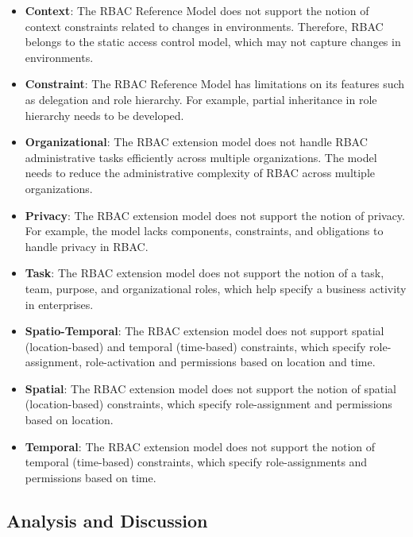 \begin{itemize}

  \item \textbf{Context}: The RBAC Reference Model does not support the notion of context constraints related to changes in environments. Therefore, RBAC belongs to the static access control model, which may not capture changes in environments.
 
  \item \textbf{Constraint}: The RBAC Reference Model has limitations on its features such as delegation and role hierarchy. For example, partial inheritance in role hierarchy needs to be developed.
  
  \item \textbf{Organizational}: The RBAC extension model does not handle RBAC administrative tasks efficiently across multiple organizations. The model needs to reduce the administrative complexity of RBAC across multiple organizations.
   
  \item \textbf{Privacy}: The RBAC extension model does not support the notion of privacy. For example, the model lacks components, constraints, and obligations to handle privacy in RBAC.
  
  \item \textbf{Task}: The RBAC extension model does not support the notion of a task, team, purpose, and organizational roles, which help specify a business activity in enterprises.
    
  \item \textbf{Spatio-Temporal}: The RBAC extension model does not support spatial (location-based) and temporal (time-based) constraints, which specify role-assignment, role-activation and permissions based on location and time.
  
  \item \textbf{Spatial}: The RBAC extension model does not support the notion of spatial (location-based)  constraints, which specify role-assignment and permissions based on location.
        
  \item \textbf{Temporal}: The RBAC extension model does not support the notion of temporal (time-based)  constraints, which specify role-assignments and permissions based on time.
      
	
\end{itemize}
 

\subsection{Analysis and Discussion}

